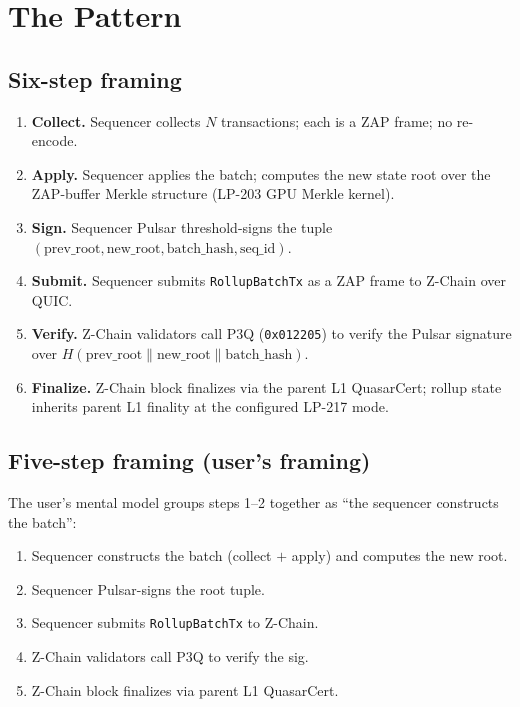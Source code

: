 \section{The Pattern}

\subsection{Six-step framing}

\begin{enumerate}[leftmargin=2em]
\item \textbf{Collect.} Sequencer collects $N$ transactions; each
  is a ZAP frame; no re-encode.
\item \textbf{Apply.} Sequencer applies the batch; computes the new
  state root over the ZAP-buffer Merkle structure (LP-203 GPU
  Merkle kernel).
\item \textbf{Sign.} Sequencer Pulsar threshold-signs the tuple
  $(\textrm{prev\_root}, \textrm{new\_root}, \textrm{batch\_hash},
  \textrm{seq\_id})$.
\item \textbf{Submit.} Sequencer submits
  \texttt{RollupBatchTx} as a ZAP frame to Z-Chain over QUIC.
\item \textbf{Verify.} Z-Chain validators call P3Q
  (\texttt{0x012205}) to verify the Pulsar signature over
  $H(\textrm{prev\_root} \| \textrm{new\_root} \|
  \textrm{batch\_hash})$.
\item \textbf{Finalize.} Z-Chain block finalizes via the parent L1
  QuasarCert; rollup state inherits parent L1 finality at the
  configured LP-217 mode.
\end{enumerate}

\subsection{Five-step framing (user's framing)}

The user's mental model groups steps 1--2 together as ``the
sequencer constructs the batch'':

\begin{enumerate}[leftmargin=2em]
\item Sequencer constructs the batch (collect $+$ apply) and
  computes the new root.
\item Sequencer Pulsar-signs the root tuple.
\item Sequencer submits \texttt{RollupBatchTx} to Z-Chain.
\item Z-Chain validators call P3Q to verify the sig.
\item Z-Chain block finalizes via parent L1 QuasarCert.
\end{enumerate}

